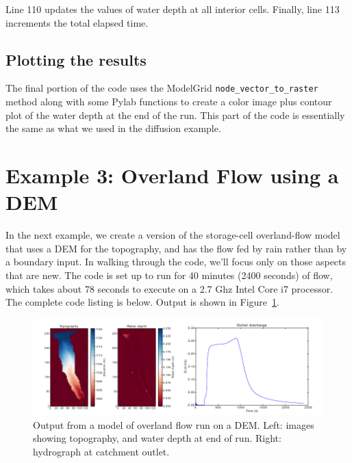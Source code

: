 \documentclass[12pt]{article}
\newcommand{\code}[1]{{\tt #1}}
\begin{document}
Line 110 updates the values of water depth at all interior cells. Finally, line 113 increments the total elapsed time.

\subsection{Plotting the results}



The final portion of the code uses the ModelGrid \code{node\_vector\_to\_raster} method along with some Pylab functions to create a color image plus contour plot of the water depth at the end of the run. This part of the code is essentially the same as what we used in the diffusion example.



\section{Example 3: Overland Flow using a DEM}

In the next example, we create a version of the storage-cell overland-flow model that uses a DEM for the topography, and has the flow fed by rain rather than by a boundary input. In walking through the code, we'll focus only on those aspects that are new. The code is set up to run for 40 minutes (2400 seconds) of flow, which takes about 78 seconds to execute on a 2.7 Ghz Intel Core i7 processor.
The complete code listing is below. Output is shown in Figure~\ref{olflowdem}.

 \begin{figure}[h!]
    \centering
    \includegraphics{overland_flow_dem.pdf}
    \caption{Output from a model of overland flow run on a DEM. Left: images showing topography, and water depth at end of run. Right: hydrograph at catchment outlet.}
   \label{olflowdem}
\end{figure}
\end{document}
